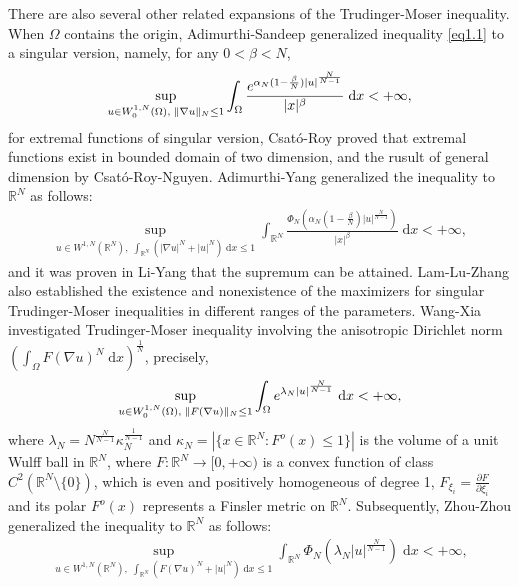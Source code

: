 \documentclass[11pt]{article}
\theoremstyle{plain}
\numberwithin{equation}{section}
\newcommand{\R}{\mathbb{R}}
\begin{document}
There are also several other related expansions of the Trudinger-Moser inequality.
When $\Omega$ contains the origin, Adimurthi-Sandeep \cite{Adimurthi-Sandeep-2007} generalized inequality \eqref{eq1.1} to a singular version, namely, for any $0<\beta<N$,
\begin{align}
    \sup\limits_{u\in W_{0}^{1,N}(\Omega),\;\|\nabla u\|_{N}\leq 1}
    \int_{\Omega}\frac{e^{\alpha_{N}(1-\frac{\beta}{N})\lvert u\rvert^{\frac{N}{N-1}}}}{\lvert x\rvert^{\beta}}\;\mathrm{d}x<+\infty,\notag
\end{align}
  for extremal functions of singular version, Csat\'{o}-Roy \cite{Csato-Roy-2015} proved that extremal functions exist in bounded domain of  two dimension, and the rusult of general dimension by  Csat\'{o}-Roy-Nguyen\cite{Csato-Nguyen-Roy-2021}.
Adimurthi-Yang \cite{Adimurthi-Yang-2010} generalized the inequality to $\R^{N}$ as follows:
\begin{align}\label{eq1.4}
    \sup\limits_{u\in W^{1,N}(\R^{N}),\;\int_{\R^{N}}(\lvert\nabla u\rvert^{N}+\lvert u\rvert^{N})\;\mathrm{d}x\leq 1}
    \int_{\R^{N}}\frac{\Phi_{N}(\alpha_{N}(1-\frac{\beta}{N})\lvert u\rvert^{\frac{N}{N-1}})}{\lvert x\rvert^{\beta}}\;\mathrm{d}x<+\infty,
\end{align}
and it was proven in Li-Yang \cite{Li-Yang-2018} that the supremum can be attained. Lam-Lu-Zhang \cite{Lam-Lu-Zhang-2019'} also established the existence
	and nonexistence of the maximizers for singular Trudinger-Moser
	inequalities in different ranges of the parameters.
Wang-Xia \cite{Wang-Xia-2012} investigated Trudinger-Moser inequality involving the anisotropic Dirichlet norm $\left(\int_{\Omega}F(\nabla u)^{N}\;\mathrm{d}x\right)^{\frac{1}{N}}$, precisely,
\begin{align}
    \sup_{u\in W_{0}^{1,N}(\Omega),\;\|F(\nabla u)\|_{N}\leq 1}
    \int_{\Omega}e^{\lambda_{N}\lvert u\rvert^{\frac{N}{N-1}}}\;\mathrm{d}x<+\infty,\notag
\end{align}
where $\lambda_{N}=N^{\frac{N}{N-1}}\kappa_{N}^{\frac{1}{N-1}}$ and $\kappa_{N}=|\{x \in \mathbb{R}^{N} : F^{o}(x)\leq 1\}|$ is the volume of a unit Wulff ball in $\mathbb{R}^N$, where $F:\mathbb{R}^{N}\rightarrow[0,+\infty)$ is a convex function of class $C^{2}(\mathbb{R}^{N}\setminus\{0\})$, which is even and positively homogeneous of degree 1, $F_{\xi_{i}} = \frac{\partial F}{\partial\xi_{i}}$ and its polar $F^{o}(x)$ represents a Finsler metric on $\mathbb{R}^{N}$. Subsequently, Zhou-Zhou \cite{Zhou-Zhou-2019}  generalized the inequality to $\R^{N}$ as follows:
\begin{align}\label{eq1.5}
    \sup_{u\in W^{1,N}(\R^{N}),\;\int_{\R^{N}}(F(\nabla u)^{N}+\lvert u\rvert^{N})\;\mathrm{d}x\leq1}\int_{\R^{N}}\Phi_{N}(\lambda_{N}\lvert u\rvert^{\frac{N}{N-1}})\;\mathrm{d}x<+\infty,
\end{align}
\end{document}
